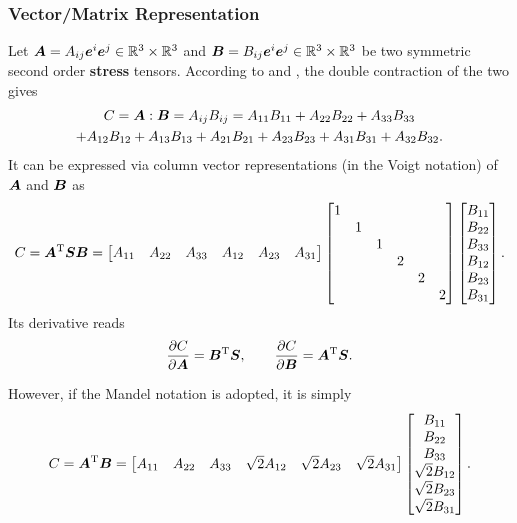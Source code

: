 \subsubsection{Vector/Matrix Representation}
Let $\bm{A}=A_{ij}\bm{e}^i\bm{e}^j\in\mathbb{R}^3\times\mathbb{R}^3$ and $\bm{B}=B_{ij}\bm{e}^i\bm{e}^j\in\mathbb{R}^3\times\mathbb{R}^3$ be two symmetric second order \textbf{stress} tensors. According to  and , the double contraction of the two gives
\begin{multline}
C=\bm{A}:\bm{B}=A_{ij}B_{ij}=A_{11}B_{11}+A_{22}B_{22}+A_{33}B_{33}\\+A_{12}B_{12}+A_{13}B_{13}+A_{21}B_{21}+A_{23}B_{23}+A_{31}B_{31}+A_{32}B_{32}.
\end{multline}
It can be expressed via column vector representations (in the Voigt notation) of $\bm{A}$ and $\bm{B}$ as
\begin{gather}
C=\bm{A}^{\mathrm{T}}\bm{S}\bm{B}=\begin{bmatrix}
A_{11}&A_{22}&A_{33}&A_{12}&A_{23}&A_{31}
\end{bmatrix}
\begin{bmatrix}
1&&&&&\\
&1&&&&\\
&&1&&&\\
&&&2&&\\
&&&&2&\\
&&&&&2
\end{bmatrix}
\begin{bmatrix}
B_{11}\\B_{22}\\B_{33}\\B_{12}\\B_{23}\\B_{31}
\end{bmatrix}.
\end{gather}
Its derivative reads
\begin{gather}
\dfrac{\partial{C}}{\partial{\bm{A}}}=\bm{B}^{\mathrm{T}}\bm{S},\qquad
\dfrac{\partial{C}}{\partial{\bm{B}}}=\bm{A}^{\mathrm{T}}\bm{S}.
\end{gather}

However, if the Mandel notation is adopted, it is simply
\begin{gather}
C=\bm{A}^{\mathrm{T}}\bm{B}=\begin{bmatrix}
A_{11}&A_{22}&A_{33}&\sqrt{2}A_{12}&\sqrt{2}A_{23}&\sqrt{2}A_{31}
\end{bmatrix}
\begin{bmatrix}
B_{11}\\B_{22}\\B_{33}\\\sqrt{2}B_{12}\\\sqrt{2}B_{23}\\\sqrt{2}B_{31}
\end{bmatrix}.
\end{gather}

